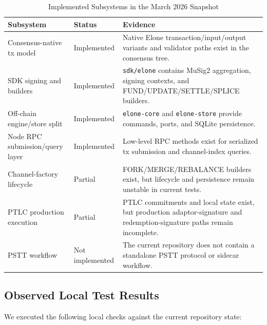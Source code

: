 \begin{table}[htbp]
\centering
\caption{Implemented Subsystems in the March 2026 Snapshot}
\label{tab:implemented_snapshot}
\small
\begin{tabularx}{\linewidth}{@{}l l X@{}}
\toprule
\textbf{Subsystem} & \textbf{Status} & \textbf{Evidence} \\
\midrule
Consensus-native tx model & Implemented & Native Elone transaction/input/output variants and validator paths exist in the consensus tree. \\
SDK signing and builders & Implemented & \texttt{sdk/elone} contains MuSig2 aggregation, signing contexts, and FUND/UPDATE/SETTLE/SPLICE builders. \\
Off-chain engine/store split & Implemented & \texttt{elone-core} and \texttt{elone-store} provide commands, ports, and SQLite persistence. \\
Node RPC submission/query layer & Implemented & Low-level RPC methods exist for serialized tx submission and channel-index queries. \\
Channel-factory lifecycle & Partial & FORK/MERGE/REBALANCE builders exist, but lifecycle and persistence remain unstable in current tests. \\
PTLC production execution & Partial & PTLC commitments and local state exist, but production adaptor-signature and redemption-signature paths remain incomplete. \\
PSTT workflow & Not implemented & The current repository does not contain a standalone PSTT protocol or sidecar workflow. \\
\bottomrule
\end{tabularx}
\end{table}

\subsection{Observed Local Test Results}

We executed the following local checks against the current repository state:

